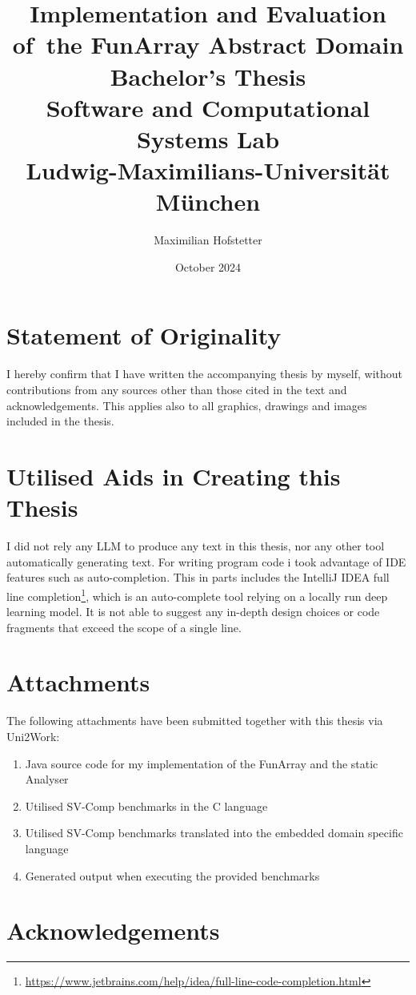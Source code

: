 \documentclass{report}
\title{\Huge{}Implementation and Evaluation of~the FunArray Abstract Domain\\[1em]\large{}Bachelor's Thesis\\[1em]Software and Computational Systems Lab\\Ludwig-Maximilians-Universit\"at M\"unchen}
\date{October 2024}
\author{Maximilian Hofstetter}
\begin{document}
\maketitle

\section*{Statement of Originality}
\thispagestyle{empty}
I hereby confirm that I have written the accompanying thesis by myself, without contributions from any sources other than those cited in the text and acknowledgements. This applies also to all graphics, drawings and images included in the thesis.

\section*{Utilised Aids in Creating this Thesis}

I did not rely any LLM to produce any text in this thesis, nor any other tool automatically generating text. For writing program code i took advantage of IDE features such as auto-completion. This in parts includes the IntelliJ IDEA full line completion\footnote{\url{https://www.jetbrains.com/help/idea/full-line-code-completion.html}}, which is an auto-complete tool relying on a locally run deep learning model. It is not able to suggest any in-depth design choices or code fragments that exceed the scope of a single line.

\section*{Attachments}

The following attachments have been submitted together with this thesis via Uni2Work:

\begin{enumerate}
	\item Java source code for my implementation of the FunArray and the static Analyser
	\item Utilised SV-Comp benchmarks in the C language
	\item Utilised SV-Comp benchmarks translated into the embedded domain specific language
	\item Generated output when executing the provided benchmarks
\end{enumerate}

\section*{Acknowledgements}
\end{document}
